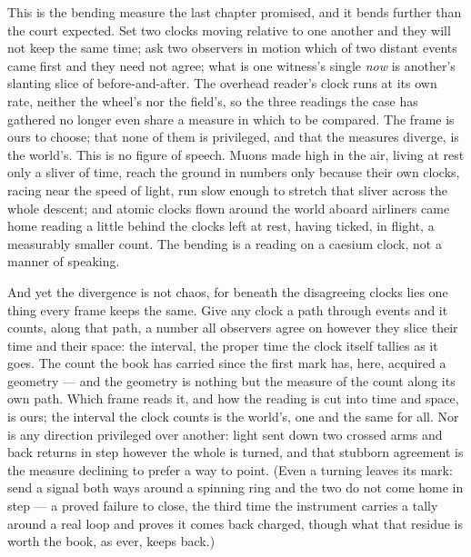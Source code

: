 This is the bending measure the last chapter promised, and it bends further than the court expected. Set two
clocks moving relative to one another and they will not keep the same time; ask two observers in motion which of
two distant events came first and they need not agree; what is one witness's single \emph{now} is another's
slanting slice of before-and-after. The overhead reader's clock runs at its own rate, neither the wheel's nor
the field's, so the three readings the case has gathered no longer even share a measure in which to be compared.
The frame is ours to choose; that none of them is privileged, and that the measures diverge, is the world's.
This is no figure of speech. Muons made high in the air, living at rest only a sliver of time, reach the ground
in numbers only because their own clocks, racing near the speed of light, run slow enough to stretch that sliver
across the whole descent; and atomic clocks flown around the world aboard airliners came home reading a little
behind the clocks left at rest, having ticked, in flight, a measurably smaller count. The bending is a reading
on a caesium clock, not a manner of speaking.

And yet the divergence is not chaos, for beneath the disagreeing clocks lies one thing every frame keeps the
same. Give any clock a path through events and it counts, along that path, a number all observers agree on
however they slice their time and their space: the interval, the proper time the clock itself tallies as it
goes. The count the book has carried since the first mark has, here, acquired a geometry --- and the geometry is
nothing but the measure of the count along its own path. Which frame reads it, and how the reading is cut into
time and space, is ours; the interval the clock counts is the world's, one and the same for all. Nor is any
direction privileged over another: light sent down two crossed arms and back returns in step however the whole
is turned, and that stubborn agreement is the measure declining to prefer a way to point. (Even a turning
leaves its mark: send a signal both ways around a spinning ring and the two do not come home in step --- a
proved failure to close, the third time the instrument carries a tally around a real loop and proves it comes
back charged, though what that residue is worth the book, as ever, keeps back.)

